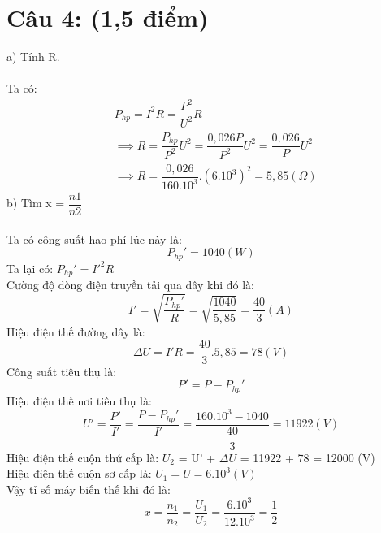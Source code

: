 \documentclass[50pt]{article}
\begin{document}
\section*{\color[HTML]{4287f5}Câu 4: (1,5 điểm)}
a) Tính R.\\
\\
Ta có:
\begin{equation*}
    \begin{aligned}
        & P_{hp} = I^2R = \dfrac{P^2}{U^2}R \\
        & \implies R = \dfrac{P_{hp}}{P^2}U^2 = \dfrac{0,026P}{P^2}U^2 = \dfrac{0,026}{P}U^2 \\
        & \implies R = \dfrac{0,026}{160.10^3}.(6.10^3)^2 = 5,85 (\Omega)
    \end{aligned}
\end{equation*}
b) Tìm x = $\dfrac{n1}{n2}$\\
\\
Ta có công suất hao phí lúc này là:
\begin{equation*}
    P_{hp}' = 1040 (W)
\end{equation*}
Ta lại có: $P_{hp}' = I'^2R$\\
Cường độ dòng điện truyền tải qua dây khi đó là:
\begin{equation*}
    I' = \sqrt{\dfrac{P_{hp}'}{R}} = \sqrt{\dfrac{1040}{5,85}} = \dfrac{40}{3} (A)
\end{equation*}
Hiệu điện thế đường dây là:
\begin{equation*}
    \Delta U = I'R = \dfrac{40}{3}.5,85 = 78 (V)
\end{equation*}
Công suất tiêu thụ là:
\begin{equation*}
    P' = P - P_{hp}'
\end{equation*}
Hiệu điện thế nơi tiêu thụ là:
\begin{equation*}
    U' = \dfrac{P'}{I'} = \dfrac{P - P_{hp}'}{I'} = \dfrac{160.10^3 - 1040}{\dfrac{40}{3}} = 11922 (V)
\end{equation*}
Hiệu điện thế cuộn thứ cấp là: $U_{2}$ = U' + $\Delta U$ = 11922 + 78 = 12000 (V)\\
Hiệu điện thế cuộn sơ cấp là: $U_{1} = U = 6.10^3 (V)$\\
Vậy tỉ số máy biến thế khi đó là:
\begin{equation*}
    x = \dfrac{n_{1}}{n_{2}} = \dfrac{U_{1}}{U_{2}} = \dfrac{6.10^3}{12.10^3} = \dfrac{1}{2}
\end{equation*}
\end{document}
